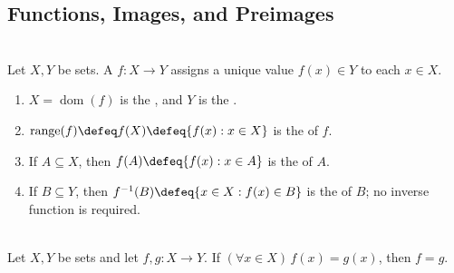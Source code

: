 \subsection{Functions, Images, and Preimages}

\begin{definition} \label{def:functions-images-preimages} \\
Let $X,Y$ be sets. A  $f:X\to Y$ assigns a unique value $f(x)\in Y$ to each $x\in X$.
\begin{enumerate}[label=(\roman*)]
\setlength{\itemsep}{0pt}
\item $X=\operatorname{dom}(f)$ is the , and $Y$ is the .
\item $\operatorname{range}(f)\defeq f(X)\defeq\{f(x):x\in X\}$ is the  of $f$.
\item If $A\subseteq X$, then $f(A)\defeq\{f(x):x\in A\}$ is the  of $A$.
\item If $B\subseteq Y$, then $f^{-1}(B)\defeq\{x\in X:f(x)\in B\}$ is the  of $B$; no inverse function is required.
\end{enumerate}
\end{definition}

\begin{assumption} \label{assump:function-extensionality} \\
Let $X,Y$ be sets and let $f,g:X\to Y$. If $(\forall x\in X)\,f(x)=g(x)$, then $f=g$.
\end{assumption}

